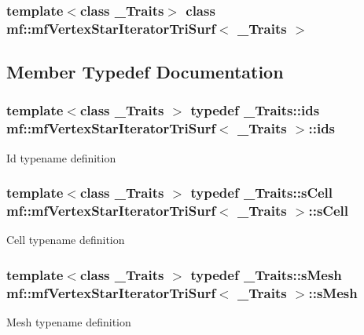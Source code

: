 \subsubsection*{template$<$class \_\-Traits$>$ class mf::mfVertexStarIteratorTriSurf$<$ \_\-Traits $>$}



\subsection{Member Typedef Documentation}
\hypertarget{classmf_1_1mfVertexStarIteratorTriSurf_acd3a7e18747ad6cc0357bdd8fa366ac7}{
\subsubsection[{ids}]{\setlength{\rightskip}{0pt plus 5cm}template$<$class \_\-Traits $>$ typedef \_\-Traits::ids {\bf mf::mfVertexStarIteratorTriSurf}$<$ \_\-Traits $>$::{\bf ids}}}
\label{classmf_1_1mfVertexStarIteratorTriSurf_acd3a7e18747ad6cc0357bdd8fa366ac7}
Id typename definition \hypertarget{classmf_1_1mfVertexStarIteratorTriSurf_afe93e1a4572dfe24b7235db18ea90437}{
\subsubsection[{sCell}]{\setlength{\rightskip}{0pt plus 5cm}template$<$class \_\-Traits $>$ typedef \_\-Traits::sCell {\bf mf::mfVertexStarIteratorTriSurf}$<$ \_\-Traits $>$::{\bf sCell}}}
\label{classmf_1_1mfVertexStarIteratorTriSurf_afe93e1a4572dfe24b7235db18ea90437}
Cell typename definition \hypertarget{classmf_1_1mfVertexStarIteratorTriSurf_a6a0a8773d65d971e636d4361fb65b5af}{
\subsubsection[{sMesh}]{\setlength{\rightskip}{0pt plus 5cm}template$<$class \_\-Traits $>$ typedef \_\-Traits::sMesh {\bf mf::mfVertexStarIteratorTriSurf}$<$ \_\-Traits $>$::{\bf sMesh}}}
\label{classmf_1_1mfVertexStarIteratorTriSurf_a6a0a8773d65d971e636d4361fb65b5af}
Mesh typename definition 

